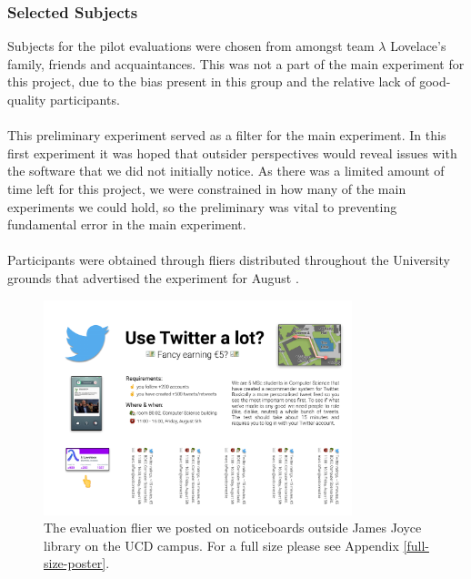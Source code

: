 \documentclass{article}
\begin{document}
\subsubsection*{Selected Subjects} %
Subjects for the pilot evaluations were chosen from amongst team $\lambda$ Lovelace's family, friends and acquaintances. This was not a part of the main experiment for this project, due to the bias present in this group and the relative lack of good-quality participants.
\\\\
This preliminary experiment served as a filter for the main experiment. In this first experiment it was hoped that outsider perspectives would reveal issues with the software that we did not initially notice. As there was a limited amount of time left for this project, we were constrained in how many of the main experiments we could hold, so the preliminary was vital to preventing fundamental error in the main experiment. 
\\\\
Participants were obtained through fliers distributed throughout the University grounds that advertised the experiment for August . 


\begin{figure}[H]
    \centering
    \includegraphics[width=0.8\textwidth]{evaluation_poster}
    \caption{The evaluation flier we posted on noticeboards outside James Joyce library on the UCD campus. For a full size please see Appendix \ref{full-size-poster}.}
\end{figure}
\end{document}
